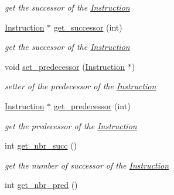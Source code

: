 \begin{DoxyCompactItemize}
\begin{DoxyCompactList}\small\item\em get the successor of the \hyperlink{classInstruction}{Instruction} \item\end{DoxyCompactList}\item 
\hypertarget{classInstruction_a57509d351b2e5e765d12a5f47f856a8b}{
\hyperlink{classInstruction}{Instruction} $\ast$ \hyperlink{classInstruction_a57509d351b2e5e765d12a5f47f856a8b}{get\_\-successor} (int)}
\label{classInstruction_a57509d351b2e5e765d12a5f47f856a8b}

\begin{DoxyCompactList}\small\item\em get the successor of the \hyperlink{classInstruction}{Instruction} \item\end{DoxyCompactList}\item 
\hypertarget{classInstruction_a24de37c121071a67c64494009cdc6e11}{
void \hyperlink{classInstruction_a24de37c121071a67c64494009cdc6e11}{set\_\-predecessor} (\hyperlink{classInstruction}{Instruction} $\ast$)}
\label{classInstruction_a24de37c121071a67c64494009cdc6e11}

\begin{DoxyCompactList}\small\item\em setter of the predecessor of the \hyperlink{classInstruction}{Instruction} \item\end{DoxyCompactList}\item 
\hypertarget{classInstruction_aadb7dfdfbbf31ab282bdddd702bd3e89}{
\hyperlink{classInstruction}{Instruction} $\ast$ \hyperlink{classInstruction_aadb7dfdfbbf31ab282bdddd702bd3e89}{get\_\-predecessor} (int)}
\label{classInstruction_aadb7dfdfbbf31ab282bdddd702bd3e89}

\begin{DoxyCompactList}\small\item\em get the predecessor of the \hyperlink{classInstruction}{Instruction} \item\end{DoxyCompactList}\item 
\hypertarget{classInstruction_a887ed41d012d516c21346be998d3623c}{
int \hyperlink{classInstruction_a887ed41d012d516c21346be998d3623c}{get\_\-nbr\_\-succ} ()}
\label{classInstruction_a887ed41d012d516c21346be998d3623c}

\begin{DoxyCompactList}\small\item\em get the number of successor of the \hyperlink{classInstruction}{Instruction} \item\end{DoxyCompactList}\item 
\hypertarget{classInstruction_af477df8db0ab13cd4a4fc358179a051b}{
int \hyperlink{classInstruction_af477df8db0ab13cd4a4fc358179a051b}{get\_\-nbr\_\-pred} ()}
\label{classInstruction_af477df8db0ab13cd4a4fc358179a051b}


\end{DoxyCompactItemize}
